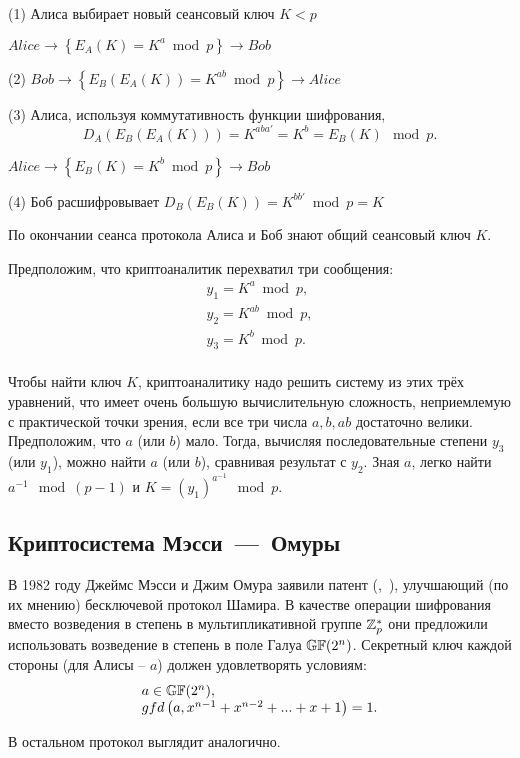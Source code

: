 \begin{protocol}
    \item[(1)] Алиса выбирает новый сеансовый ключ $K < p$
    \item[{}] $Alice \to \left\{ E_A \left( K \right) = K^a \bmod p \right\} \to Bob$
    \item[(2)] $Bob \to \left\{ E_B \left( E_A \left( K \right) \right) = K^{ab} \bmod p \right\} \to Alice$
    \item[(3)] Алиса, используя коммутативность функции шифрования,
	\[ D_A \left( E_B \left( E_A \left( K \right) \right) \right) = K^{aba'} = K^b = E_B \left( K \right) \mod p. \]
    \item[{}] $Alice \to \left\{ E_B \left( K \right) = K^b \bmod p \right\} \to Bob$
    \item[(4)] Боб расшифровывает $D_B \left( E_B \left( K \right) \right) = K^{bb'} \bmod p = K$
\end{protocol}

По окончании сеанса протокола Алиса и Боб знают общий сеансовый ключ $K$.

Предположим, что криптоаналитик перехватил три сообщения:
\[ \begin{array}{l}
    y_1 = K^a \bmod p, \\
    y_2 = K^{ab} \bmod p, \\
    y_3 = K^b \bmod p. \\
\end{array} \]

Чтобы найти ключ $K$, криптоаналитику надо решить систему из этих трёх уравнений, что имеет очень большую вычислительную сложность, неприемлемую с практической точки зрения, если все три числа $a, b, ab$ достаточно велики. Предположим, что $a$ (или $b$) мало. Тогда, вычисляя последовательные степени $y_3$ (или $y_1$), можно найти $a$ (или $b$), сравнивая результат с $y_2$. Зная $a$, легко найти $a^{-1}\mod(p-1)$ и $K=(y_1)^{a^{-1}}\mod p$.


\subsection{Криптосистема Мэсси~---~Омуры}

В 1982 году Джеймс Мэсси и Джим Омура заявили патент (,~\cite{Massey:Omura:1986}), улучшающий (по их мнению) бесключевой протокол Шамира. В качестве операции шифрования вместо возведения в степень в мультипликативной группе $\mathbb{Z}_p^*$ они предложили использовать возведение в степень в поле Галуа $\mathbb{GF}(2^n)$. Секретный ключ каждой стороны (для Алисы -- $a$) должен удовлетворять условиям:
\[ \begin{array}{l}
 a \in \mathbb{GF}(2^n), \\
 gfd \left( a, x^{ n-1 } + x^{ n-2 } + ... + x + 1 \right) = 1. \\
\end{array} \]

В остальном протокол выглядит аналогично.

